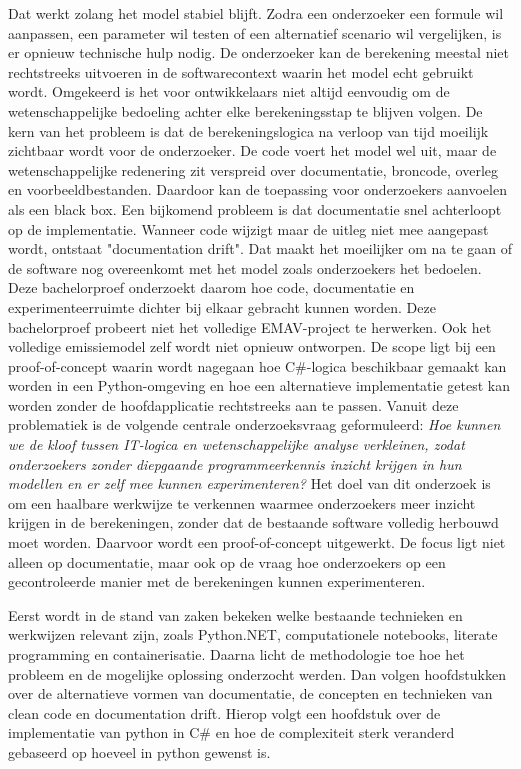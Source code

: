 Dat werkt zolang het model stabiel blijft. Zodra een onderzoeker een formule wil aanpassen, een parameter wil testen of een alternatief scenario wil vergelijken, is er opnieuw technische hulp nodig. De onderzoeker kan de berekening meestal niet rechtstreeks uitvoeren in de softwarecontext waarin het model echt gebruikt wordt. Omgekeerd is het voor ontwikkelaars niet altijd eenvoudig om de wetenschappelijke bedoeling achter elke berekeningsstap te blijven volgen. 
De kern van het probleem is dat de berekeningslogica na verloop van tijd moeilijk zichtbaar wordt voor de onderzoeker. De code voert het model wel uit, maar de wetenschappelijke redenering zit verspreid over documentatie, broncode, overleg en voorbeeldbestanden. Daardoor kan de toepassing voor onderzoekers aanvoelen als een black box.                                                                                                                                   
Een bijkomend probleem is dat documentatie snel achterloopt op de implementatie. Wanneer code wijzigt maar de uitleg niet mee aangepast wordt, ontstaat "documentation drift". Dat maakt het moeilijker om na te gaan of de software nog overeenkomt met het model zoals onderzoekers het bedoelen. Deze bachelorproef onderzoekt daarom hoe code, documentatie en experimenteerruimte dichter bij elkaar gebracht kunnen worden.                                                  
Deze bachelorproef probeert niet het volledige EMAV-project te herwerken. Ook het volledige emissiemodel zelf wordt niet opnieuw ontworpen. De scope ligt bij een proof-of-concept waarin wordt nagegaan hoe C\#-logica beschikbaar gemaakt kan worden in een Python-omgeving en hoe een alternatieve implementatie getest kan worden zonder de hoofdapplicatie rechtstreeks aan te passen.                                                                                        
Vanuit deze problematiek is de volgende centrale onderzoeksvraag geformuleerd:
\textit{Hoe kunnen we de kloof tussen IT-logica en wetenschappelijke analyse verkleinen, zodat onderzoekers zonder diepgaande programmeerkennis inzicht krijgen in hun modellen en er zelf mee kunnen experimenteren?}                                   Het doel van dit onderzoek is om een haalbare werkwijze te verkennen waarmee onderzoekers meer inzicht krijgen in de berekeningen, zonder dat de bestaande software volledig herbouwd moet worden. Daarvoor wordt een proof-of-concept uitgewerkt. De focus ligt niet alleen op documentatie, maar ook op de vraag hoe onderzoekers op een gecontroleerde manier met de berekeningen kunnen experimenteren.

Eerst wordt in de stand van zaken bekeken welke bestaande technieken en werkwijzen relevant zijn, zoals Python.NET, computationele notebooks, literate programming en containerisatie. 
Daarna licht de methodologie toe hoe het probleem en de mogelijke oplossing onderzocht werden.
Dan volgen hoofdstukken over de alternatieve vormen van documentatie, de concepten en technieken van clean code en documentation drift.
Hierop volgt een hoofdstuk over de implementatie van python in C\# en hoe de complexiteit sterk veranderd gebaseerd op hoeveel in python gewenst is.

